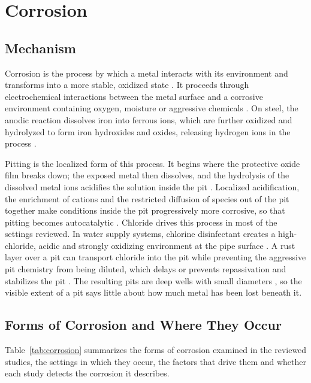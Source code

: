 \section{Corrosion}
\label{sec:lr-corrosion}

\subsection{Mechanism}

Corrosion is the process by which a metal interacts with its environment and
transforms into a more stable, oxidized state \citep{Elizalde2023}. It proceeds through
electrochemical interactions between the metal surface and a corrosive
environment containing oxygen, moisture or aggressive chemicals \citep{Alvani2026}. On steel,
the anodic reaction dissolves iron into ferrous ions, which are further oxidized
and hydrolyzed to form iron hydroxides and oxides, releasing hydrogen ions in the
process \citep{Liu2026}.

Pitting is the localized form of this process. It begins where the protective
oxide film breaks down; the exposed metal then dissolves, and the hydrolysis of
the dissolved metal ions acidifies the solution inside the pit \citep{Liu2026}. Localized
acidification, the enrichment of cations and the restricted diffusion of species
out of the pit together make conditions inside the pit progressively more
corrosive, so that pitting becomes autocatalytic \citep{Liu2026}. Chloride drives this
process in most of the settings reviewed. In water supply systems, chlorine
disinfectant creates a high-chloride, acidic and strongly oxidizing environment
at the pipe surface \citep{Li2022}. A rust layer over a pit can transport chloride into
the pit while preventing the aggressive pit chemistry from being diluted, which
delays or prevents repassivation and stabilizes the pit \citep{Nguyen2026}. The resulting pits
are deep wells with small diameters \citep{Soares2023}, so the visible extent of a pit says
little about how much metal has been lost beneath it.

\subsection{Forms of Corrosion and Where They Occur}

Table~\ref{tab:corrosion} summarizes the forms of corrosion examined in the
reviewed studies, the settings in which they occur, the factors that drive them
and whether each study detects the corrosion it describes.

